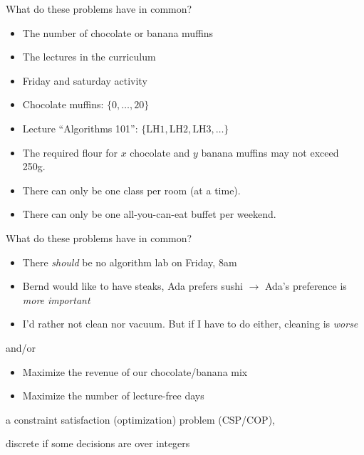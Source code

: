 \begin{frame}{What do these problems have in common?}
 
\begin{itemize}
\item The number of chocolate or banana muffins
\item The lectures in the curriculum
\item Friday and saturday activity
\end{itemize}
\pause

\vspace*{2ex}

 
\begin{itemize}
\item Chocolate muffins: $\{0, \ldots, 20\}$
\item Lecture ``Algorithms 101'': $\{\mathrm{LH1}, \mathrm{LH2}, \mathrm{LH3}, \ldots \}$
\end{itemize}

\pause

\vspace*{2ex}

 
\begin{itemize}
\item The required flour for $x$ chocolate and $y$ banana muffins may not exceed 250g.
\item There can only be one class per room (at a time).
\item There can only be one all-you-can-eat buffet per weekend.
\end{itemize} \pause 
\end{frame}

\begin{frame}{What do these problems have in common?}
 
\begin{itemize}
\item There \emph{should} be no algorithm lab on Friday, 8am
\item Bernd would like to have steaks, Ada prefers sushi $\rightarrow$ Ada's preference is \emph{more important}
\item I'd rather not clean nor vacuum. But if I have to do either, cleaning is \emph{worse}
\end{itemize}
\pause

\vspace*{2ex}
and/or
\vspace*{2ex}

 
\begin{itemize}
\item Maximize the revenue of our chocolate/banana mix
\item Maximize the number of lecture-free days 
\end{itemize}

\vspace*{2ex}
\hfill a \alert{constraint satisfaction (optimization) problem} (CSP/COP), 

\hfill discrete if some decisions are over integers 
\end{frame}


